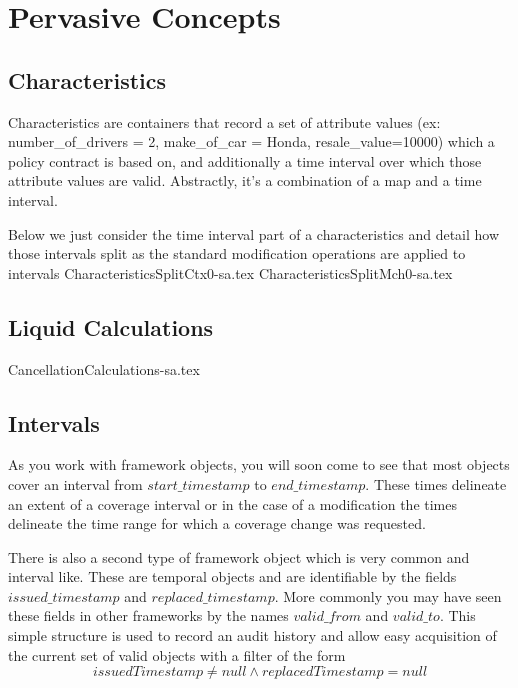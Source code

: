 \motto{}
\chapter{Pervasive Concepts}
\label{intro03} %

\abstract{
}

\section{Characteristics}
\label{sec:03:1}

Characteristics are containers that record a set of attribute values
(ex: number\_of\_drivers = 2, make\_of\_car = Honda, resale\_value=10000)
which a policy contract is based on, and additionally a time interval over which
those attribute values are valid. Abstractly, it's a combination of a map and a time
interval. 

Below we just consider the time interval part of a characteristics and detail
how those intervals split as the standard modification operations are applied
to intervals
{CharacteristicsSplitCtx0-sa.tex}
{CharacteristicsSplitMch0-sa.tex}

\section{Liquid Calculations}
\label{sec:03:2}

{CancellationCalculations-sa.tex}

\section{Intervals}
As you work with framework objects, you will soon come to see that most objects cover
an interval from $start\_timestamp$ to $end\_timestamp$. These times delineate an extent of
a coverage interval or in the case of a modification the times delineate the time range for
which a coverage change was requested.

There is also a second type of framework object which is very common and interval like. These
are temporal objects and are identifiable by the fields $issued\_timestamp$ and $replaced\_timestamp$.
More commonly you may have seen these fields in other frameworks by the names $valid\_from$ and
$valid\_to$. This simple structure is used to record an audit history and allow easy acquisition of the current set
of valid objects with a filter of the form
\begin{equation*}
issuedTimestamp \neq null \land replacedTimestamp = null
\end{equation*}


